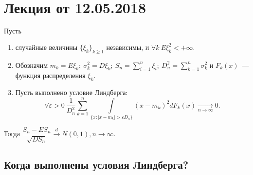 
	\section{Лекция от 12.05.2018}
	\begin{theorem}[Линдберга][б/д]
		Пусть 
		\begin{enumerate}
		    \item случайные величины \(\{\xi_k\}_{k \geqslant 1}\) независимы, и \(\forall k~ E\xi_k^2 < +\infty\).
		    \item Обозначим \(m_k = E\xi_k; ~\sigma^2_k = D\xi_k; ~S_n = \sum\limits_{i = 1}^{n}\xi_i; ~D_n^2 = \sum\limits_{k = 1}^{n}\sigma^2_k\) и \(F_k(x)\)~--- функция распределения \(\xi_k\).
		    \item Пусть выполнено условие Линдберга:
    		\[
    			\forall \varepsilon > 0 ~ \frac{1}{D^2_n} \sum\limits_{k = 1}^{n} \int\limits_{\{x:|x - m_k| > \varepsilon D_n\}}(x-m_k)^2 dF_k(x) \underset{n \to \infty}{\longrightarrow} 0.
    		\]
		\end{enumerate} 
		
		Тогда \( \dfrac{S_n - ES_n}{\sqrt{DS_n}} \overset{d}{\longrightarrow} N(0,1), n\to \infty\).
	\end{theorem}

	\subsection{Когда выполнены условия Линдберга?}

